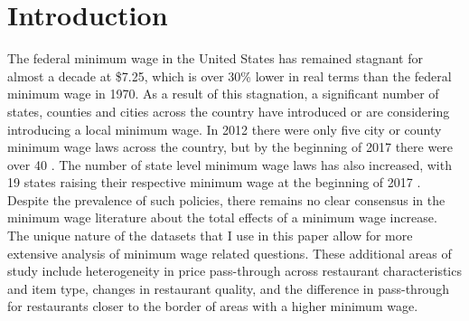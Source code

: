 \documentclass[11pt]{article}
\begin{document}
\section{Introduction}
The federal minimum wage in the United States has remained stagnant for almost a decade at \$7.25, which is over 30\% lower in real terms than the federal minimum wage in 1970. As a result of this stagnation, a significant number of states, counties and cities across the country have introduced or are considering introducing a local minimum wage. In 2012 there were only five city or county minimum wage laws across the country, but by the beginning of 2017 there were over 40 \cite{localmws}. The number of state level minimum wage laws has also increased, with 19 states raising their respective minimum wage at the beginning of 2017 \cite{epimw}. Despite the prevalence of such policies, there remains no clear consensus in the minimum wage literature about the total effects of a minimum wage increase. The unique nature of the datasets that I use in this paper allow for more extensive analysis of minimum wage related questions. These additional areas of study include heterogeneity in price pass-through across restaurant characteristics and item type, changes in restaurant quality, and the difference in pass-through for restaurants closer to the border of areas with a higher minimum wage. 
\end{document}

